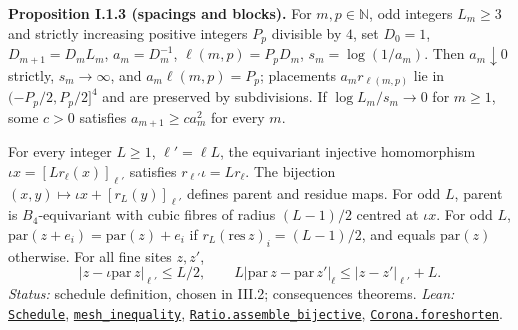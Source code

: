 \documentclass[
  letterpaper,
  11pt]{article}
\begin{document}
\textbf{Proposition I.1.3 (spacings and blocks).} For
\(m,p\in\mathbb N\), odd integers \(L_m\ge3\) and strictly increasing
positive integers \(P_p\) divisible by \(4\), set \(D_0=1\),
\(D_{m+1}=D_mL_m\), \(a_m=D_m^{-1}\), \(\ell(m,p)=P_pD_m\),
\(s_m=\log(1/a_m)\). Then \(a_m\downarrow0\) strictly, \(s_m\to\infty\),
and \(a_m\ell(m,p)=P_p\); placements \(a_mr_{\ell(m,p)}\) lie in
\((-P_p/2,P_p/2]^4\) and are preserved by subdivisions. If
\(\log L_m/s_m\to0\) for \(m\ge1\), some \(c>0\) satisfies
\(a_{m+1}\ge ca_m^2\) for every \(m\).

For every integer \(L\ge1\), \(\ell'=\ell L\), the equivariant injective
homomorphism \(\iota x=[Lr_\ell(x)]_{\ell'}\) satisfies
\(r_{\ell'}\iota=Lr_\ell\). The bijection
\((x,y)\mapsto\iota x+[r_L(y)]_{\ell'}\) defines parent and residue
maps. For odd \(L\), parent is \(B_4\)-equivariant with cubic fibres of
radius \((L-1)/2\) centred at \(\iota x\). For odd \(L\),
\(\mathrm{par}(z+e_i)=\mathrm{par}(z)+e_i\) if
\(r_L(\mathrm{res}\,z)_i=(L-1)/2\), and equals \(\mathrm{par}(z)\)
otherwise. For all fine sites \(z,z'\),
\[|z-\iota\mathrm{par}\,z|_{\ell'}\le L/2,\qquad L|\mathrm{par}\,z-\mathrm{par}\,z'|_\ell\le|z-z'|_{\ell'}+L.\]
\emph{Status:} schedule definition, chosen in III.2; consequences
theorems. \emph{Lean:}
\href{https://github.com/yang-mills-group/OpenAI-YM-20261028/blob/3456e5e75cf8d4cd558955a5c7638fba2d68f464/YM/Lattice/Scale.lean\#L28-L34}{\texttt{Schedule}},
\href{https://github.com/yang-mills-group/OpenAI-YM-20261028/blob/3456e5e75cf8d4cd558955a5c7638fba2d68f464/YM/Lattice/Scale.lean\#L133-L162}{\texttt{mesh\_inequality}},
\href{https://github.com/yang-mills-group/OpenAI-YM-20261028/blob/3456e5e75cf8d4cd558955a5c7638fba2d68f464/YM/Lattice/Subdivision.lean\#L103-L111}{\texttt{Ratio.assemble\_bijective}},
\href{https://github.com/yang-mills-group/OpenAI-YM-20261028/blob/3456e5e75cf8d4cd558955a5c7638fba2d68f464/YM/Corona/Spend.lean\#L32-L36}{\texttt{Corona.foreshorten}}.
\end{document}
